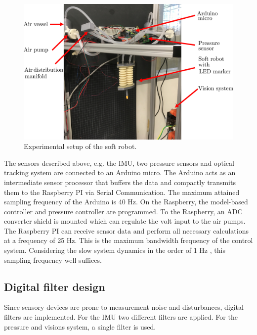 \begin{figure}[H]
    \centering
    \includegraphics[width = \textwidth]{Figures/Chapter5/expsetup.png}
    \caption{Experimental setup of the soft robot.}
    \label{fig5:setup}
\end{figure}


The sensors described above, e.g. the IMU, two pressure sensors and optical tracking system are connected to an Arduino micro. The Arduino acts as an intermediate sensor processor that buffers the data and compactly transmits them to the Raspberry PI via Serial Communication. The maximum attained sampling frequency of the Arduino is 40 Hz. On the Raspberry, the model-based controller and pressure controller are programmed. To the Raspberry, an ADC converter shield is mounted which can regulate the volt input to the air pumps. The Raspberry PI can receive sensor data and perform all necessary calculations at a frequency of 25 Hz. This is the maximum bandwidth frequency of the control system. Considering the slow system dynamics in the order of 1 Hz \cite{tawk2018bioinspired},\cite{HighBandwidthControl} this sampling frequency well suffices.


\subsection*{Digital filter design}

Since sensory devices are prone to measurement noise and disturbances, digital filters are implemented. For the IMU two different filters are applied. For the pressure and visions system, a single filter is used. 

